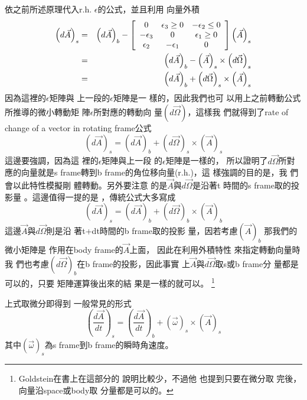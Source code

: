 \documentclass[12pt,a4paper]{article}
\begin{document}
依之前所述原理代入r.h. 
$\epsilon $的公式，並且利用%
向量外積%
\begin{eqnarray*}
\left( d\vec{A}\right) _{s} &=&\left( d\vec{A}\right) _{b}-\left[ 
\begin{array}{ccc}
0 & \epsilon _{3}\geq 0 & -\epsilon _{2}\leq 0 \\ 
-\epsilon _{3} & 0 & \epsilon _{1}\geq 0 \\ 
\epsilon _{2} & -\epsilon _{1} & 0%
\end{array}%
\right] \left( \vec{A}\right) _{s} \\
&=&\left( d\vec{A}\right) _{b}-\left( \vec{A}\right) _{s}\times \left( d\vec{%
\Omega}\right) _{s} \\
&=&\left( d\vec{A}\right) _{b}+\left( d\vec{\Omega}\right) _{s}\times \left( 
\vec{A}\right) _{s}
\end{eqnarray*}%
因為這裡的$\epsilon $矩陣與%
上一段的$\epsilon $矩陣是一%
樣的，因此我們也可%
以用上之前轉動公式%
所推導的微小轉動矩%
陣$\epsilon $所對應的轉動向%
量$\left( d\vec{\Omega}\right) $，這樣我%
們就得到了rate of change of a vector in
rotating frame公式%
\begin{equation}
\left( d\vec{A}\right) _{s}=\left( d\vec{A}\right) _{b}+\left( d\vec{\Omega}%
\right) _{s}\times \left( \vec{A}\right) _{s}  \label{rateofdomega}
\end{equation}%
這邊要強調，因為這%
裡的$\epsilon $矩陣與上一段%
的$\epsilon $矩陣是一樣的，%
所以證明了$d\vec{\Omega}$所對%
應的向量就是s frame轉到b
frame的角位移向量(r.h.)，這%
樣強調的目的是，我%
們會以此特性模擬剛%
體轉動。另外要注意%
的是$\vec{A}$與$d\vec{\Omega}$是沿著t%
時間的s frame取的投影量%
。這邊值得一提的是%
，傳統公式大多寫成%
\begin{equation*}
\left( d\vec{A}\right) _{s}=\left( d\vec{A}\right) _{b}+\left( d\vec{\Omega}%
\right) _{b}\times \left( \vec{A}\right) _{b}
\end{equation*}%
這邊$\vec{A}$與$d\vec{\Omega}$則是沿%
著t+dt時間的b frame取的投影%
量，因若考慮$\left( \vec{A}\right) _{b}$%
那我們的微小矩陣是%
作用在body frame的$\vec{A}$上面，%
因此在利用外積特性%
來指定轉動向量時我%
們也考慮$\left( d\vec{\Omega}\right) _{b}$在b
frame的投影$， $因此事實%
上$\vec{A}$與$d\vec{\Omega}$取s或b frame分%
量都是可以的，只要%
矩陣運算後出來的結%
果是一樣的就可以。%
\footnote{%
Goldstein在書上在這部分的%
說明比較少，不過他%
也提到只要在微分取%
完後，向量沿space或body取%
分量都是可以的\cite[p. 176]%
{goldstein}。}

\bigskip 上式取微分即得到%
一般常見的形式%
\begin{equation}
\left( \frac{d\vec{A}}{dt}\right) _{s}=\left( \frac{d\vec{A}}{dt}\right)
_{b}+\left( \vec{\omega}\right) _{s}\times \left( \vec{A}\right) _{s}
\label{rateofchange}
\end{equation}%
其中$\left( \vec{\omega}\right) _{s}$為s frame到b
frame的瞬時角速度。
\end{document}
